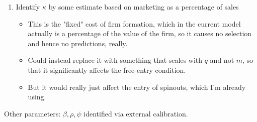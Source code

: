 \documentclass[12pt,english]{article}
\theoremstyle{remark}
\begin{document}
\begin{enumerate}
	\item Identify $\kappa$ by some estimate based on marketing as a percentage of sales
	\begin{itemize}
		\item This is the "fixed" cost of firm formation, which in the current model actually is a percentage of the value of the firm, so it causes no selection and hence no predictions, really.
		\item Could instead replace it with something that scales with $q$ and not $m$, so that it significantly affects the free-entry condition.
		\item But it would really just affect the entry of spinouts, which I'm already using.
	\end{itemize}
\end{enumerate}

Other parameters: $\beta,\rho,\psi$ identified via external calibration. 
\end{document}
